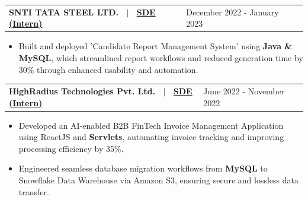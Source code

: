 \documentclass[a4paper,10pt]{article}
\newenvironment{jobshort}[2]
    {
    \noindent\begin{tabularx}{\linewidth}{l X r}
    	\textbf{#1} & \hfill #2 \\[-10pt] %
    \end{tabularx}
    }
    {
    \vspace{-3pt} %
    }
\begin{document}
\begin{jobshort}{SNTI TATA STEEL LTD. \ $|$ \ \href{https://drive.google.com/file/d/1AJs1bdv-YMY8GrjvO3VE4SJwJIv275PG/view?usp=share_link}{SDE (Intern)}}{December 2022 - January 2023}
    \begin{itemize}[itemsep=-5pt]
        \item Built and deployed 'Candidate Report Management System' using \textbf{Java \& MySQL}, which streamlined report workflows and reduced generation time by 30\% through enhanced usability and automation.
    \end{itemize}
\end{jobshort}

\begin{jobshort}{HighRadius Technologies Pvt. Ltd. \ $|$ \ \href{https://drive.google.com/drive/folders/1L19tKgR8kvodTWy2_siyHbBTPfNWRRSx?usp=share_link}{SDE (Intern)}}{June 2022 - November 2022}
    \begin{itemize}[itemsep=-5pt]
        \item Developed an AI-enabled B2B FinTech Invoice Management Application using ReactJS and \textbf{Servlets}, automating invoice tracking and improving processing efficiency by 35\%.
        \item Engineered seamless database migration workflows from \textbf{MySQL} to Snowflake Data Warehouse via Amazon S3, ensuring secure and lossless data transfer.
    \end{itemize}
\end{jobshort}

\end{document}

